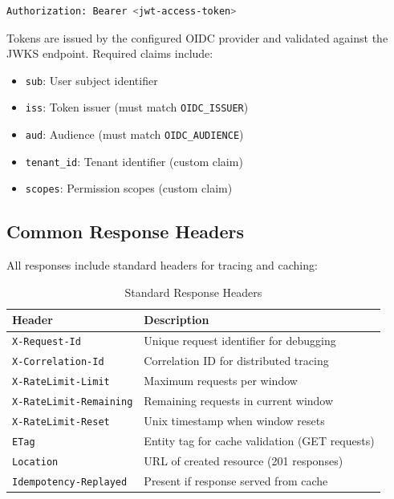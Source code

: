 \begin{lstlisting}[language=bash]
Authorization: Bearer <jwt-access-token>
\end{lstlisting}

Tokens are issued by the configured OIDC provider and validated against the JWKS endpoint. Required claims include:
\begin{itemize}
    \item \texttt{sub}: User subject identifier
    \item \texttt{iss}: Token issuer (must match \texttt{OIDC\_ISSUER})
    \item \texttt{aud}: Audience (must match \texttt{OIDC\_AUDIENCE})
    \item \texttt{tenant\_id}: Tenant identifier (custom claim)
    \item \texttt{scopes}: Permission scopes (custom claim)
\end{itemize}

\subsection{Common Response Headers}

All responses include standard headers for tracing and caching:

\begin{table}[ht]
\centering
\caption{Standard Response Headers}
\label{tab:response-headers}
\small
\begin{tabularx}{\textwidth}{lX}
    \hline
    \textbf{Header} & \textbf{Description} \\
    \hline
    \texttt{X-Request-Id} & Unique request identifier for debugging \\
    \texttt{X-Correlation-Id} & Correlation ID for distributed tracing \\
    \texttt{X-RateLimit-Limit} & Maximum requests per window \\
    \texttt{X-RateLimit-Remaining} & Remaining requests in current window \\
    \texttt{X-RateLimit-Reset} & Unix timestamp when window resets \\
    \texttt{ETag} & Entity tag for cache validation (GET requests) \\
    \texttt{Location} & URL of created resource (201 responses) \\
    \texttt{Idempotency-Replayed} & Present if response served from cache \\
    \hline
\end{tabularx}
\end{table}

